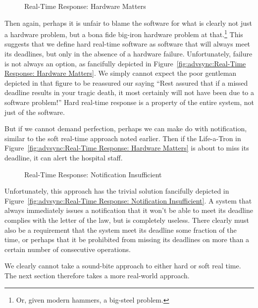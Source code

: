 \begin{figure}[bt]
\centering
{}
\caption{Real-Time Response: Hardware Matters}
\end{figure}

Then again, perhaps it is unfair to blame the software for what is clearly
not just a hardware problem, but a bona fide big-iron hardware problem
at that.\footnote{
	Or, given modern hammers, a big-steel problem.}
This suggests that we define hard real-time software as software that
will always meet its deadlines, but only in the absence of a hardware
failure.
Unfortunately, failure is not always an option, as fancifully depicted in
Figure~\ref{fig:advsync:Real-Time Response: Hardware Matters}.
We simply cannot expect the poor gentleman depicted in that figure to be
reassured our saying ``Rest assured that if a missed deadline results
in your tragic death, it most certainly will not have been due to a
software problem!''
Hard real-time response is a property of the entire system, not
just of the software.

But if we cannot demand perfection, perhaps we can make do with
notification, similar to the soft real-time approach noted earlier.
Then if the Life-a-Tron in
Figure~\ref{fig:advsync:Real-Time Response: Hardware Matters}
is about to miss its deadline,
it can alert the hospital staff.

\begin{figure}[bt]
\centering
{}
\caption{Real-Time Response: Notification Insufficient}
\end{figure}

Unfortunately, this approach has the trivial solution fancifully depicted in
Figure~\ref{fig:advsync:Real-Time Response: Notification Insufficient}.
A system that always immediately issues a notification that it won't
be able to meet its deadline complies with the letter of the law,
but is completely useless.
There clearly must also be a requirement that the system meet its deadline
some fraction of the time, or perhaps that it be prohibited from missing
its deadlines on more than a certain number of consecutive operations.

We clearly cannot take a sound-bite approach to either hard or soft
real time.
The next section therefore takes a more real-world approach.

